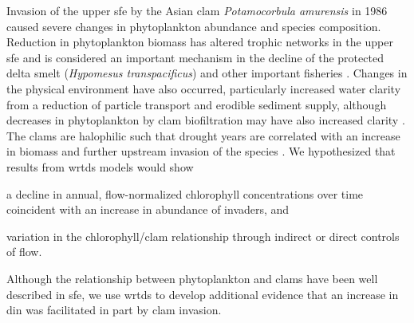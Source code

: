 \documentclass[letterpaper,12pt,oneside]{article}\usepackage[]{graphicx}\usepackage[]{color}
\begin{document}
Invasion of the upper \ac{sfe} by the Asian clam \textit{Potamocorbula amurensis} in 1986 caused severe changes in phytoplankton abundance and species composition.  Reduction in phytoplankton biomass has altered trophic networks in the upper \ac{sfe} and is considered an important mechanism in the decline of the protected delta smelt (\textit{Hypomesus transpacificus}) and other important fisheries \cite{Feyrer03,MacNally10}.  Changes in the physical environment have also occurred, particularly increased water clarity from a reduction of particle transport and erodible sediment supply,\cite{Jassby08,Schoellhamer11,Cloern12b} although decreases in phytoplankton by clam biofiltration may have also increased clarity \cite{MacNally10}. The clams are halophilic such that drought years are correlated with an increase in biomass and further upstream invasion of the species \cite{Parchaso02,Cloern12b}. We hypothesized that results from \ac{wrtds} models would show \begin{inparaenum}[1\upshape)]
\item a decline in annual, flow-normalized chlorophyll concentrations over time coincident with an increase in abundance of invaders, and
\item variation in the chlorophyll/clam relationship through indirect or direct controls of flow.
\end{inparaenum}
Although the relationship between phytoplankton and clams have been well described in \ac{sfe}\cite{Kimmerer14}, we use \ac{wrtds} to develop additional evidence that an increase in \ac{din} was facilitated in part by clam invasion.
\end{document}
